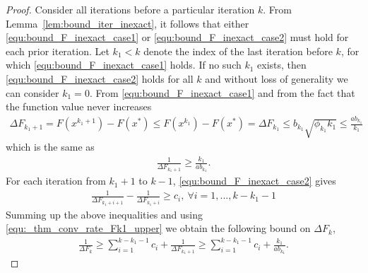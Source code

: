 \documentclass[11pt]{article}
\numberwithin{equation}{section}
\begin{document}
\begin{proof}
Consider all iterations before a particular iteration $k$.  From Lemma~\ref{lem:bound_iter_inexact}, it follows that either 
 \eqref{equ:bound_F_inexact_case1} or \eqref{equ:bound_F_inexact_case2} must hold for each prior iteration.
       Let $k_1 <k$  denote the index of the last iteration before $k$,  for which \eqref{equ:bound_F_inexact_case1} holds. If no such $k_1$ exists, then \eqref{equ:bound_F_inexact_case2} holds for all $k$ and without loss of generality we can consider $k_1=0$. From \eqref{equ:bound_F_inexact_case1} and from the fact that the function value never increases
	 \begin{align}
	\label{equ:_thm_conv_rate_case1}
	    \Delta F_{k_1+1}=F(x^{k_1+1}) - F(x^*) \leq   F(x^{k_1}) - F(x^*) =\Delta F_{k_1} \leq b_{k_1} \sqrt{\phi_{k_1}k_1} \leq  \frac {a b_{k_1}}{k_1}
	\end{align}
	which is the same as
		 \begin{align}\label{equ:_thm_conv_rate_Fk1_upper}
	  \frac{1}{\Delta F_{k_1+1}} \geq  \frac{k_1} {a b_{k_1}}.
	  \end{align}
	  For each iteration from  $k_1+1$ to $k-1$, \eqref{equ:bound_F_inexact_case2}  gives 
	\begin{align*}
	    \frac{1}{\Delta F_{k_1 + i + 1}} - \frac{1}{\Delta F_{k_1 + i}} \geq c_i, ~\forall i = 1, ..., k-k_1-1
	\end{align*}
	Summing up the above inequalities  and using \eqref{equ:_thm_conv_rate_Fk1_upper} we obtain the following bound on 
	$\Delta F_{k}$, 
	\begin{align}\label{eq:finalsum}
	    \frac{1}{\Delta F_{k }} \geq \sum_{i=1}^{k-k_1-1}c_i+  \frac{1}{\Delta F_{k_1 + 1}} \geq  
	    \sum_{i=1}^{k-k_1-1}c_i+ \frac{k_1} {a b_{k_1} }.
	\end{align}
	

\end{proof}
\end{document}
